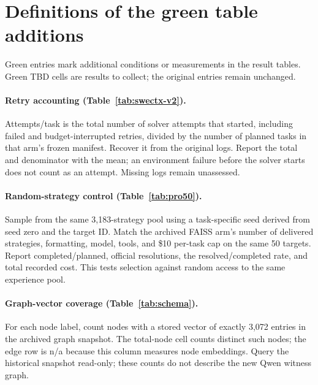 \begingroup
\tableaddcolor
\section{Definitions of the green table additions}
\label{sec:table-additions}
Green entries mark additional conditions or measurements in the result tables.
Green TBD cells are results to collect; the original entries remain unchanged.

\paragraph{Retry accounting (Table~\ref{tab:swectx-v2}).}
Attempts/task is the total number of solver attempts that started, including
failed and budget-interrupted retries, divided by the number of planned tasks
in that arm's frozen manifest. Recover it from the original logs. Report the
total and denominator with the mean; an environment failure before the solver
starts does not count as an attempt. Missing logs remain unassessed.

\paragraph{Random-strategy control (Table~\ref{tab:pro50}).}
Sample from the same 3,183-strategy pool using a task-specific seed derived
from seed zero and the target ID. Match the archived FAISS arm's number of
delivered strategies, formatting, model, tools, and \$10 per-task cap on the
same 50 targets. Report completed/planned, official resolutions, the
resolved/completed rate, and total recorded cost. This tests selection against
random access to the same experience pool.

\paragraph{Graph-vector coverage (Table~\ref{tab:schema}).}
For each node label, count nodes with a stored vector of exactly 3,072 entries
in the archived graph snapshot. The total-node cell counts distinct such
nodes; the edge row is n/a because this column measures node embeddings.
Query the historical snapshot read-only; these counts do not describe the
new Qwen witness graph.

